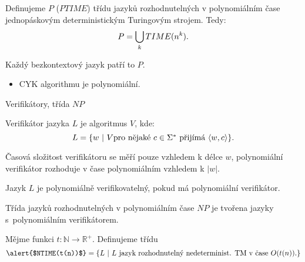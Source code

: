     
    
    
    \begin{frame}%
    \begin{definition}[třída $P$]
    Definujeme \alert{$P$ ($PTIME$)} \alert{třídu jazyků rozhodnutelných v polynomiálním čase} jednopáskovým deterministickým Turingovým strojem. Tedy:
    $$P=\bigcup_k TIME(n^k)\hbox{.}$$
    \end{definition}
    
    \begin{theorem}
    Každý bezkontextový jazyk patří to $P$.
    \end{theorem}
    \begin{itemize}
        \item CYK algorithmu je polynomiální.
    \end{itemize}
    
    \end{frame}
    
    
    
    
    
    
    
    
    
    \begin{frame}{Verifikátory, třída $NP$}
    
    \begin{definition}[Verifikátor]
    \alert{Verifikátor} jazyka $L$ je algoritmus $V$, kde:
    $$L=
    \{ w\ | \ V \hbox{pro nějaké $c\in \Sigma^*$ přijímá }\langle w,c\rangle \}\hbox{.}
    $$
    
    Časová složitost verifikátoru se měří pouze vzhledem k délce $w$, \alert{polynomiální verifikátor} rozhoduje v čase polynomiálním vzhledem k $|w|$.
    
    Jazyk $L$ je \alert{polynomiálně verifikovatelný}, pokud má polynomiální verifikátor.
    
    \alert{Třída jazyků rozhodnutelných v polynomiálním čase} \alert{$NP$ }  je tvořena jazyky s~polynomiálním verifikátorem.
    \end{definition}
    
    
    \begin{definition}[$NP$]
    Mějme funkci $t: \mathbb{N}\to \mathbb{R}^+$. Definujeme třídu
    $$\hbox{\alert{$NTIME(t(n))$}}=
    \{ L\ | \ L \hbox{ jazyk rozhodnutelný nedeterminist. TM v čase $O(t(n))$.}\}
    $$
    
    \end{definition}
    
    \end{frame}
    
